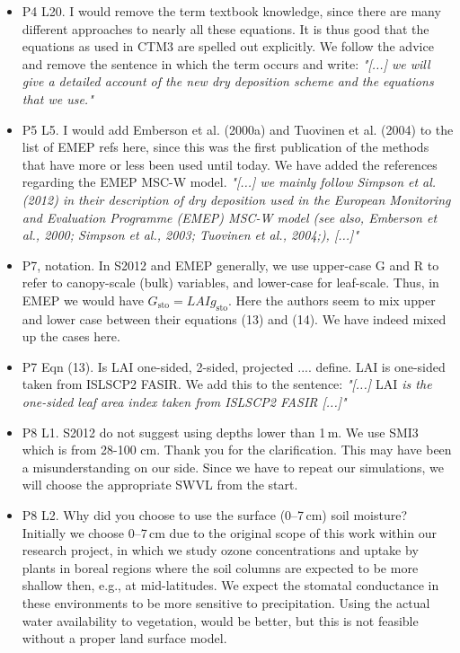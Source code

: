 \begin{itemize}
\item {\color{blue}P4 L20. I would remove the term textbook knowledge, since there are many
different approaches to nearly all these equations. It is thus good that the equations
as used in CTM3 are spelled out explicitly.}
  We follow the advice and remove the sentence in which the term occurs and write: \emph{"[...] we will give a detailed account of the new dry deposition scheme and the equations that we use."}
  
\item {\color{blue}P5 L5. I would add Emberson et al. (2000a) and Tuovinen et al. (2004) to
the list of EMEP refs here, since this was the first publication of the methods that
have more or less been used until today.}
  We have added the references regarding the EMEP MSC-W model. \emph{"[...] we mainly follow Simpson et al. (2012) in their description of dry deposition used in the European Monitoring and Evaluation Programme (EMEP) MSC-W model (see also, Emberson et al., 2000; Simpson et al., 2003; Tuovinen et al., 2004;), [...]"}
  
\item {\color{blue}P7, notation. In S2012 and EMEP generally, we use upper-case G and R to refer
to canopy-scale (bulk) variables, and lower-case for leaf-scale. Thus, in EMEP
we would have $G_\mathrm{sto} = LAI g_\mathrm{sto}$. Here the authors seem to mix upper and lower
case between their equations (13) and (14).}
  We have indeed mixed up the cases here.
  
\item {\color{blue}P7 Eqn (13). Is LAI one-sided, 2-sided, projected .... define.}
  LAI is one-sided taken from ISLSCP2 FASIR. We add this to the sentence: \emph{"[...] $\text{LAI}$ is the one-sided leaf area index taken from ISLSCP2 FASIR [...]"}
  
\item {\color{blue}P8 L1. S2012 do not suggest using depths lower than 1\,m. We use SMI3 which
  is from 28-100 cm.}
Thank you for the clarification. This may have been a misunderstanding on our side. Since we have to repeat our simulations, we will choose the appropriate SWVL from the start.
  
\item {\color{blue}P8 L2. Why did you choose to use the surface (0--7\,cm) soil moisture?}
  Initially we choose 0--7\,cm due to the original scope of this work within our research project, in which we study ozone concentrations and uptake by plants in boreal regions where the soil columns are expected to be more shallow then, e.g., at mid-latitudes. We expect the stomatal conductance in these environments to be more sensitive to precipitation. Using the actual water availability to vegetation, would be better, but this is not feasible without a proper land surface model. 
  

\end{itemize}
